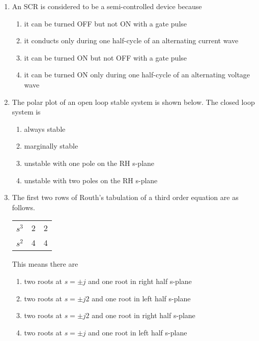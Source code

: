 \documentclass[journal,9pt,onecolumn]{IEEEtran}
\begin{document}
\begin{enumerate}
\item  An SCR is considered to be a semi-controlled device because
\begin{enumerate}
    \item it can be turned OFF but not ON with a gate pulse
    \item it conducts only during one half-cycle of an alternating current wave
    \item it can be turned ON but not OFF with a gate pulse
    \item it can be turned ON only during one half-cycle of an alternating voltage wave
\end{enumerate}


\item The polar plot of an open loop stable system is shown below. The closed loop system is
\begin{center}
    
\end{center}
\begin{multicols}{2}
\begin{enumerate}
    \item always stable
    \item marginally stable
    \item unstable with one pole on the RH s-plane
    \item unstable with two poles on the RH s-plane
\end{enumerate}
\end{multicols}


\item  The first two rows of Routh's tabulation of a third order equation are as follows.

\begin{center}
\begin{tabular}{lll}
$s^{3}$ & 2 & 2 \\
$s^{2}$ & 4 & 4 \\
\end{tabular}
\end{center}
This means there are
\begin{enumerate}
    \item two roots at $s= \pm j$ and one root in right half s-plane
    \item  two roots at $s= \pm j 2$ and one root in left half s-plane
    \item  two roots at $s= \pm j 2$ and one root in right half s-plane
    \item  two roots at $s= \pm j$ and one root in left half s-plane
\end{enumerate}




\end{enumerate}
\end{document}
